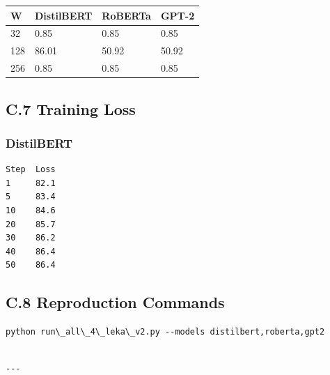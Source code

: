 \begin{table}[H]
\centering
\small
\begin{tabular}{llll}
\toprule
\textbf{W} & \textbf{DistilBERT} & \textbf{RoBERTa} & \textbf{GPT-2} \\
\midrule
32 & 0.85 & 0.85 & 0.85 \\
128 & 86.01 & 50.92 & 50.92 \\
256 & 0.85 & 0.85 & 0.85 \\
\bottomrule
\end{tabular}
\end{table}

\subsection{C.7 Training Loss}

\subsubsection{DistilBERT}
\begin{lstlisting}
Step  Loss
1     82.1
5     83.4
10    84.6
20    85.7
30    86.2
40    86.4
50    86.4
\end{lstlisting}

\subsection{C.8 Reproduction Commands}

\begin{lstlisting}
python run\_all\_4\_leka\_v2.py --models distilbert,roberta,gpt2
\end{lstlisting}
\begin{lstlisting}

---
\end{lstlisting}